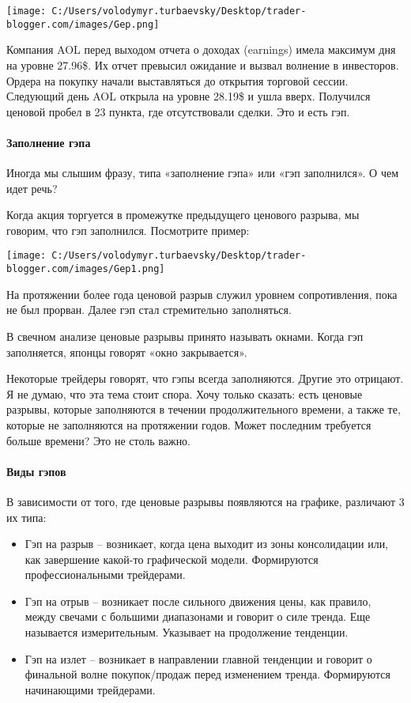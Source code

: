 \documentclass[a5paper]{article}
\begin{document}
\texttt{[image: C:/Users/volodymyr.turbaevsky/Desktop/trader-blogger.com/images/Gep.png]}

Компания AOL перед выходом отчета о доходах (earnings) имела максимум
дня на уровне 27.96\$. Их отчет превысил ожидание и вызвал волнение в
инвесторов. Ордера на покупку начали выставляться до открытия торговой
сессии. Следующий день AOL открыла на уровне 28.19\$ и ушла
вверх. Получился ценовой пробел в 23 пункта, где отсутствовали
сделки. Это и есть гэп.

\paragraph{Заполнение гэпа}

Иногда мы слышим фразу, типа «заполнение гэпа» или «гэп заполнился». О чем идет речь?

Когда акция торгуется в промежутке предыдущего ценового разрыва, мы
говорим, что гэп заполнился. Посмотрите пример:

\texttt{[image: C:/Users/volodymyr.turbaevsky/Desktop/trader-blogger.com/images/Gep1.png]}

На протяжении более года ценовой разрыв служил уровнем сопротивления, пока не был прорван. Далее гэп стал стремительно заполняться.

В свечном анализе ценовые разрывы принято называть окнами. Когда гэп заполняется, японцы говорят «окно закрывается».

Некоторые трейдеры говорят, что гэпы всегда заполняются. Другие это
отрицают. Я не думаю, что эта тема стоит спора. Хочу только сказать:
есть ценовые разрывы, которые заполняются в течении продолжительного
времени, а также те, которые не заполняются на протяжении годов. Может
последним требуется больше времени? Это не столь важно.

\paragraph{Виды гэпов}

В зависимости от того, где ценовые разрывы появляются на графике, различают 3 их типа:
\begin{itemize}
\item     Гэп на разрыв – возникает, когда цена выходит из зоны консолидации или, как завершение какой-то графической модели. Формируются профессиональными трейдерами.
\item     Гэп на отрыв – возникает после сильного движения цены, как правило, между свечами с большими диапазонами и говорит о силе тренда. Еще называется измерительным. Указывает на продолжение тенденции.
\item     Гэп на излет – возникает в направлении главной тенденции и
  говорит о финальной волне покупок/продаж перед изменением
  тренда. Формируются начинающими трейдерами.
\end{itemize}
\end{document}
